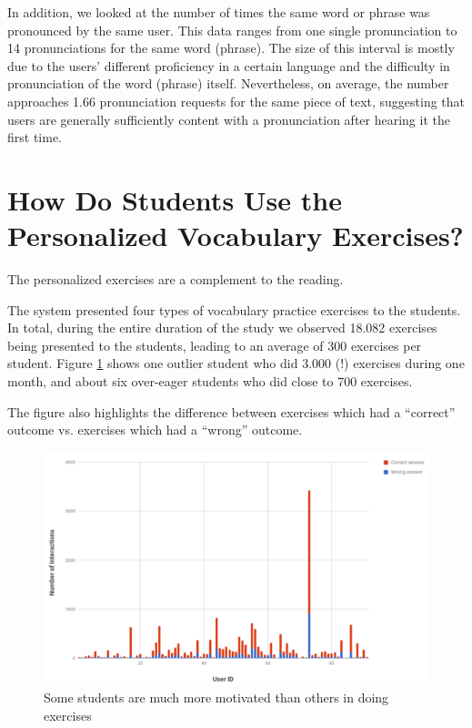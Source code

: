 In addition, we looked at the number of times the same word or phrase was pronounced by the same user. This data ranges from one single pronunciation to 14 pronunciations for the same word (phrase). The size of this interval is mostly due to the users' different proficiency in a certain language and the difficulty in pronunciation of the word (phrase) itself. Nevertheless, on average, the number approaches 1.66 pronunciation requests for the same
piece of text, suggesting that users are generally sufficiently content with a pronunciation after hearing it the first time.



\section{How Do Students Use the Personalized Vocabulary Exercises?}

The personalized exercises are a complement to the reading. 

The system presented four types of vocabulary practice exercises to the students. In total, during the entire duration of the study we observed 18.082 exercises being presented to the students, leading to an average of 300 exercises per student. Figure \ref{fig:ex_interactions} shows one outlier student who did 3.000 (!) exercises during one month, and about six over-eager students who did close to 700 exercises. 

The figure also highlights the difference between exercises which had a ``correct'' outcome vs. exercises which had a ``wrong'' outcome. 


  \begin{figure}[h!]
  \centering
    \includegraphics[width=\columnwidth]{figures/exercise_interactions_count.png}
    \caption{Some students are much more motivated than others in doing exercises }
    \label{fig:ex_interactions}
  \end{figure}


